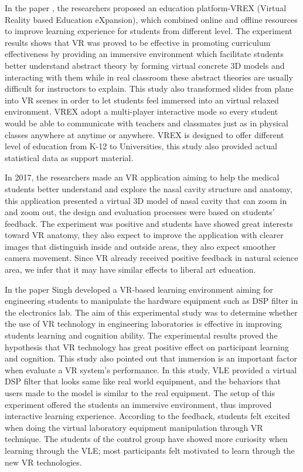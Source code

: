 \documentclass{vgtc}                          %
\begin{document}
In the paper \cite{ying2017vrex}, the researchers proposed an education platform-VREX (Virtual Reality based Education eXpansion), which combined online and offline resources to improve learning experience for students from different level. The experiment results shows that VR was proved to be effective in promoting curriculum effectiveness by providing an immersive environment which facilitate students better understand abstract theory by forming virtual concrete 3D models and interacting with them while in real classroom these abstract theories are usually difficult for instructors to explain. This study also transformed slides from plane into VR scenes in order to let students feel immersed into an virtual relaxed environment. VREX adopt a multi-player interactive mode so every student would be able to communicate with teachers and classmates just as in physical classes anywhere at anytime or anywhere. VREX is designed to offer different level of education from K-12 to Universities, this study also provided actual statistical data as support material.

In 2017, the researchers \cite{marks2017getting} made an VR application aiming to help the medical students better understand and explore the nasal cavity structure and anatomy, this application presented a virtual 3D model of nasal cavity that can zoom in and zoom out, the design and evaluation processes were based on students' feedback. The experiment was positive and students have showed great interests toward VR anatomy, they also expect to improve the application with clearer images that distinguish inside and outside areas, they also expect smoother camera movement. Since VR already received positive feedback in natural science area, we infer that it may have similar effects to liberal art education.

In the paper \cite{singh2021virtual} Singh developed a VR‐based learning environment aiming for engineering students to manipulate the hardware equipment such as DSP filter in the electronics lab. The aim of this experimental study was to determine whether the use of VR technology in engineering laboratories is effective in improving students learning and cognition ability. The experimental results proved 
the hypothesis that VR technology has great positive effect on participant learning and cognition. 
This study also pointed out that immersion is an important factor when evaluate a VR system's performance. In this study, VLE provided a virtual DSP filter that looks same like real world equipment, and the behaviors that users made to the model is similar to the real equipment. The setup of this experiment offered the students an immersive environment, thus improved interactive learning experience. According to the feedback, students felt excited when doing the virtual laboratory equipment manipulation through VR technique. The students of the control group have showed more curiosity when learning through the VLE; most participants felt motivated to learn through the new VR technologies.
\end{document}
